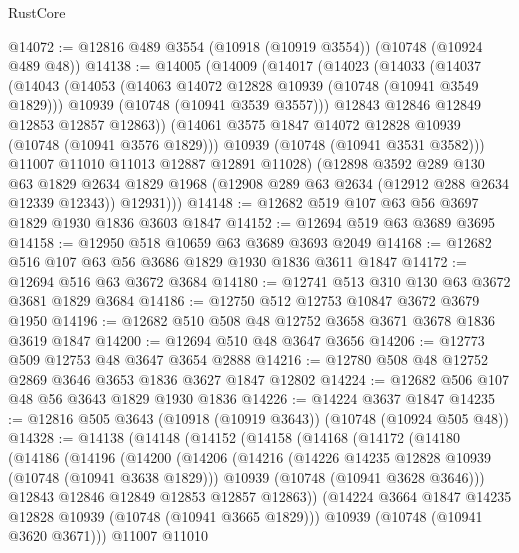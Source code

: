 \begin{lexlean}{RustCore}
\begin{coremodule}
@14072 := @12816 @489 @3554 (@10918 (@10919 @3554)) (@10748 (@10924 @489 @48))
@14138 := @14005
    (@14009
      (@14017
        (@14023
          (@14033
            (@14037
              (@14043
                (@14053
                  (@14063 @14072 @12828 @10939 (@10748 (@10941 @3549 @1829)))
                  @10939
                  (@10748 (@10941 @3539 @3557)))
                @12843
                @12846
                @12849
                @12853
                @12857
                @12863))
            (@14061 @3575 @1847 @14072 @12828 @10939 (@10748 (@10941 @3576 @1829)))
            @10939
            (@10748 (@10941 @3531 @3582)))
          @11007
          @11010
          @11013
          @12887
          @12891
          @11028)
        (@12898
          @3592
          @289
          @130
          @63
          @1829
          @2634
          @1829
          @1968
          (@12908 @289 @63 @2634 (@12912 @288 @2634 @12339 @12343))
          @12931)))
@14148 := @12682 @519 @107 @63 @56 @3697 @1829 @1930 @1836 @3603 @1847
@14152 := @12694 @519 @63 @3689 @3695
@14158 := @12950 @518 @10659 @63 @3689 @3693 @2049
@14168 := @12682 @516 @107 @63 @56 @3686 @1829 @1930 @1836 @3611 @1847
@14172 := @12694 @516 @63 @3672 @3684
@14180 := @12741 @513 @310 @130 @63 @3672 @3681 @1829 @3684
@14186 := @12750 @512 @12753 @10847 @3672 @3679 @1950
@14196 := @12682 @510 @508 @48 @12752 @3658 @3671 @3678 @1836 @3619 @1847
@14200 := @12694 @510 @48 @3647 @3656
@14206 := @12773 @509 @12753 @48 @3647 @3654 @2888
@14216 := @12780 @508 @48 @12752 @2869 @3646 @3653 @1836 @3627 @1847 @12802
@14224 := @12682 @506 @107 @48 @56 @3643 @1829 @1930 @1836
@14226 := @14224 @3637 @1847
@14235 := @12816 @505 @3643 (@10918 (@10919 @3643)) (@10748 (@10924 @505 @48))
@14328 := @14138
    (@14148
      (@14152
        (@14158
          (@14168
            (@14172
              (@14180
                (@14186
                  (@14196
                    (@14200
                      (@14206
                        (@14216
                          (@14226 @14235 @12828 @10939 (@10748 (@10941 @3638 @1829)))
                          @10939
                          (@10748 (@10941 @3628 @3646)))
                        @12843
                        @12846
                        @12849
                        @12853
                        @12857
                        @12863))
                    (@14224 @3664 @1847 @14235 @12828 @10939 (@10748 (@10941 @3665 @1829)))
                    @10939
                    (@10748 (@10941 @3620 @3671)))
                  @11007
                  @11010

\end{coremodule}
\end{lexlean}
